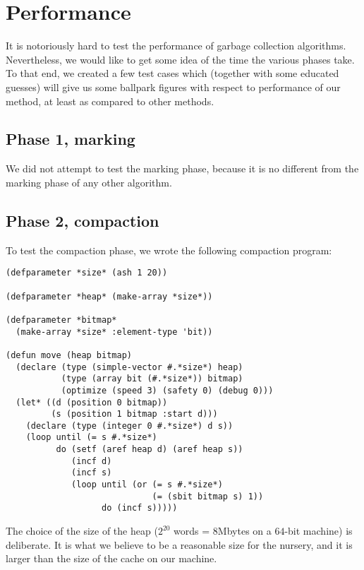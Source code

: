 \section{Performance}

It is notoriously hard to test the performance of garbage collection
algorithms.  Nevertheless, we would like to get some idea of the time
the various phases take.  To that end, we created a few test cases
which (together with some educated guesses) will give us some ballpark
figures with respect to performance of our method, at least as
compared to other methods. 

\subsection{Phase 1, marking}

We did not attempt to test the marking phase, because it is no
different from the marking phase of any other algorithm.

\subsection{Phase 2, compaction}

To test the compaction phase, we wrote the following compaction
program:

{\small\begin{verbatim}
(defparameter *size* (ash 1 20))

(defparameter *heap* (make-array *size*))

(defparameter *bitmap*
  (make-array *size* :element-type 'bit))

(defun move (heap bitmap)
  (declare (type (simple-vector #.*size*) heap)
           (type (array bit (#.*size*)) bitmap)
           (optimize (speed 3) (safety 0) (debug 0)))
  (let* ((d (position 0 bitmap))
         (s (position 1 bitmap :start d)))
    (declare (type (integer 0 #.*size*) d s))
    (loop until (= s #.*size*)
          do (setf (aref heap d) (aref heap s))
             (incf d)
             (incf s)
             (loop until (or (= s #.*size*)
                             (= (sbit bitmap s) 1))
                   do (incf s)))))
  \end{verbatim}}

The choice of the size of the heap ($2^{20}$ words = $8$Mbytes on a
$64$-bit machine) is deliberate.  It is what we believe to be a
reasonable size for the nursery, and it is larger than the size of the
cache on our machine.

